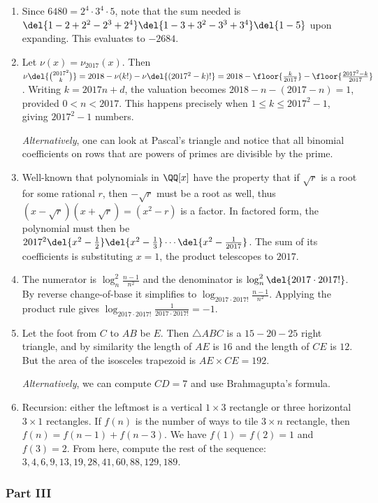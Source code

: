 \documentclass[10pt,paper=letter]{scrartcl}
\begin{document}
\begin{enumerate}
  \item Since $6480 = 2^4 \cdot 3^4 \cdot 5$, note that the sum needed is $\del{1 - 2 + 2^2 - 2^3 + 2^4}\del{1 -3 + 3^2 - 3^3 + 3^4}\del{1-5}$ upon expanding. This evaluates to $-2684$.
  \item Let $\nu(x) = \nu_{2017}(x)$. Then $\nu\del{\binom{2017^2}{k}} = 2018 - \nu(k!) - \nu\del{(2017^2-k)!} = 2018 - \floor{\frac{k}{2017}} - \floor{\frac{2017^2 - k}{2017}}$. Writing $k = 2017n + d$, the valuation becomes $2018 - n - (2017 - n) = 1$, provided $0 < n < 2017$. This happens precisely when $1 \leq k \leq 2017^2 - 1$, giving $2017^2 - 1$ numbers.

  \emph{Alternatively}, one can look at Pascal's triangle and notice that all binomial coefficients on rows that are powers of primes are divisible by the prime.
  \item Well-known that polynomials in $\QQ[x]$ have the property that if $\sqrt{r}$ is a root for some rational $r$, then $-\sqrt{r}$ must be a root as well, thus $(x-\sqrt{r})(x+\sqrt{r}) = (x^2 - r)$ is a factor. In factored form, the polynomial must then be $2017^2\del{x^2 - \frac12}\del{x^2 - \frac13}\cdots\del{x^2 - \frac1{2017}}$. The sum of its coefficients is substituting $x = 1$, the product telescopes to $2017$.
  \item The numerator is $\log_n^2 \frac{n-1}{n^2}$ and the denominator is $\log_n^2 \del{2017 \cdot 2017!}$. By reverse change-of-base it simplifies to $\log_{2017 \cdot 2017!} \frac{n-1}{n^2}$. Applying the product rule gives $\log_{2017 \cdot 2017!} \frac1{2017 \cdot 2017!} = -1$.
  \item Let the foot from $C$ to $AB$ be $E$. Then $\triangle ABC$ is a $15-20-25$ right triangle, and by similarity the length of $AE$ is $16$ and the length of $CE$ is $12$. But the area of the isosceles trapezoid is $AE \times CE = 192$.

  \emph{Alternatively}, we can compute $CD = 7$ and use Brahmagupta's formula. 
  \item Recursion: either the leftmost is a vertical $1 \times 3$ rectangle or three horizontal $3 \times 1$ rectangles. If $f(n)$ is the number of ways to tile $3 \times n$ rectangle, then $f(n) = f(n-1) + f(n-3)$. We have $f(1) = f(2) = 1$ and $f(3) = 2$. From here, compute the rest of the sequence: $3, 4, 6, 9, 13, 19, 28, 41, 60, 88, 129, 189$.
\end{enumerate}

\subsubsection*{Part III}
\end{document}
